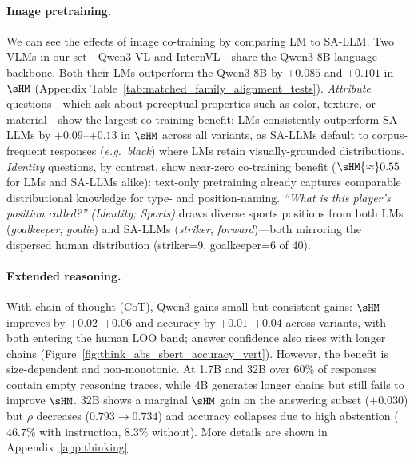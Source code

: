 \paragraph{Image pretraining.}
We can see the effects of image co-training by comparing LM to SA-LLM. %
Two VLMs in our set---Qwen3-VL and InternVL---share the Qwen3-8B language backbone.
Both their LMs outperform the Qwen3-8B by $+0.085$ and $+0.101$ in $\sHM$ (Appendix Table~\ref{tab:matched_family_alignment_tests}).
\textit{Attribute} questions---which ask about perceptual properties such as color, texture, or material---show the largest co-training benefit: LMs consistently outperform SA-LLMs by $+0.09$--$+0.13$ in $\sHM$ across all variants, as SA-LLMs default to corpus-frequent responses (\textit{e.g.}~\textit{black}) where LMs retain visually-grounded distributions.
\textit{Identity} questions, by contrast, show near-zero co-training benefit ($\sHM{\approx}0.55$ for LMs and SA-LLMs alike): text-only pretraining already captures comparable distributional knowledge for type- and position-naming. \textit{``What is this player's position called?''} \emph{(Identity; Sports)} draws diverse sports positions from both LMs (\textit{goalkeeper}, \textit{goalie}) and SA-LLMs (\textit{striker}, \textit{forward})---both mirroring the dispersed human distribution (striker=9, goalkeeper=6 of 40).

\paragraph{Extended reasoning.} %
With chain-of-thought (CoT), Qwen3 gains small but consistent gains: $\sHM$ improves by $+0.02$--$+0.06$ and accuracy by $+0.01$--$+0.04$ across variants, with both entering the human LOO band; answer confidence also rises with longer chains (Figure~\ref{fig:think_abs_sbert_accuracy_vert}).
However, the benefit is size-dependent and non-monotonic. 
At 1.7B and 32B over 60\% of responses contain empty reasoning traces, while 4B generates longer chains but still fails to improve $\sHM$.
32B shows a marginal $\sHM$ gain on the answering subset ($+0.030$) but $\rho$ decreases ($0.793{\to}0.734$) and accuracy collapses due to high abstention ($46.7\%$ with instruction, $8.3\%$ without).
More details are shown in Appendix~\ref{app:thinking}.


